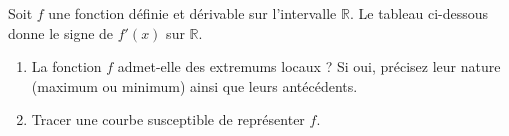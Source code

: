\documentclass[11pt]{article}
\begin{document}
\begin{exo}[$4$ points]
  Soit $f$ une fonction définie et dérivable sur l'intervalle $\mathbb{R}$. Le
  tableau ci-dessous donne le signe de $f'(x)$ sur $\mathbb{R}$.
  \begin{center}
  \end{center}
  \begin{enumerate}
    \item La fonction $f$ admet-elle des extremums locaux ? Si oui, précisez
      leur nature (maximum ou minimum) ainsi que leurs antécédents.
    \item Tracer une courbe susceptible de représenter $f$.
  \end{enumerate}
\end{exo}
\end{document}
